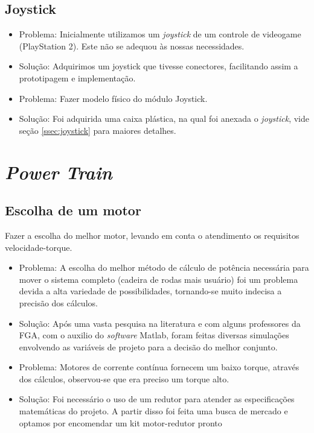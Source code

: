 \subsection{Joystick}
 \begin{itemize}
  \item Problema: Inicialmente utilizamos um \textit{joystick} de um controle de videogame (PlayStation 2). Este não se adequou às nossas necessidades.
  \item Solução: Adquirimos um joystick que tivesse conectores, facilitando assim a prototipagem e implementação.

  \item Problema: Fazer modelo físico do módulo Joystick.
  \item Solução: Foi adquirida uma caixa plástica, na qual foi anexada o \textit{joystick}, vide seção \ref{ssec:joystick} para maiores detalhes.
 \end{itemize}

\section{\textit{Power Train}}

\subsection{Escolha de um motor}
  Fazer a escolha do melhor motor, levando em conta o atendimento os requisitos velocidade-torque.
 \begin{itemize}
  \item Problema: A escolha do melhor método de cálculo de potência necessária para mover o sistema completo (cadeira de rodas mais usuário) foi um problema devida a alta variedade de possibilidades, tornando-se muito indecisa a precisão dos cálculos.
  \item Solução: Após uma vasta pesquisa na literatura e com alguns professores da FGA, com o auxilio do \textit{software} Matlab, foram feitas diversas simulações envolvendo as variáveis de projeto para a decisão do melhor conjunto.

  \item Problema: Motores de corrente contínua fornecem um baixo torque, através dos cálculos, observou-se que era preciso um torque alto.
  \item Solução: Foi necessário o uso de um redutor para atender as especificações matemáticas do projeto. A partir disso foi feita uma busca de mercado e optamos por encomendar um kit motor-redutor pronto

 \end{itemize}

